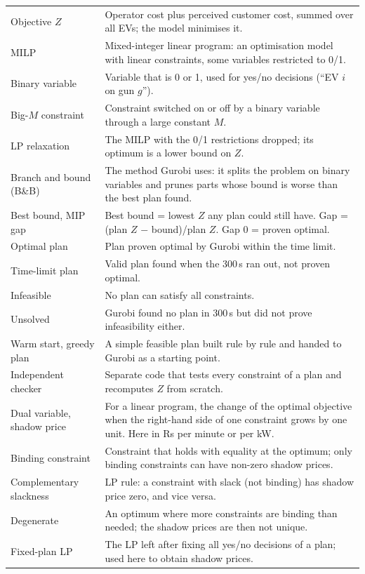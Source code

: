 \documentclass[11pt,a4paper]{article}
\begin{document}
\begin{xltabular}{\textwidth}{@{}>{\raggedright\arraybackslash}p{4.0cm}X@{}}
Objective $Z$ & Operator cost plus perceived customer cost, summed over all EVs; the model minimises it. \\
MILP & Mixed-integer linear program: an optimisation model with linear constraints, some variables restricted to 0/1. \\
Binary variable & Variable that is 0 or 1, used for yes/no decisions (``EV $i$ on gun $g$''). \\
Big-$M$ constraint & Constraint switched on or off by a binary variable through a large constant $M$. \\
LP relaxation & The MILP with the 0/1 restrictions dropped; its optimum is a lower bound on $Z$. \\
Branch and bound (B\&B) & The method Gurobi uses: it splits the problem on binary variables and prunes parts whose bound is worse than the best plan found. \\
Best bound, MIP gap & Best bound = lowest $Z$ any plan could still have. Gap = (plan $Z$ $-$ bound)/plan $Z$. Gap 0 = proven optimal. \\
Optimal plan & Plan proven optimal by Gurobi within the time limit. \\
Time-limit plan & Valid plan found when the 300\,s ran out, not proven optimal. \\
Infeasible & No plan can satisfy all constraints. \\
Unsolved & Gurobi found no plan in 300\,s but did not prove infeasibility either. \\
Warm start, greedy plan & A simple feasible plan built rule by rule and handed to Gurobi as a starting point. \\
Independent checker & Separate code that tests every constraint of a plan and recomputes $Z$ from scratch. \\
Dual variable, shadow price & For a linear program, the change of the optimal objective when the right-hand side of one constraint grows by one unit. Here in Rs per minute or per kW. \\
Binding constraint & Constraint that holds with equality at the optimum; only binding constraints can have non-zero shadow prices. \\
Complementary slackness & LP rule: a constraint with slack (not binding) has shadow price zero, and vice versa. \\
Degenerate & An optimum where more constraints are binding than needed; the shadow prices are then not unique. \\
Fixed-plan LP & The LP left after fixing all yes/no decisions of a plan; used here to obtain shadow prices. \\

\end{xltabular}
\end{document}
